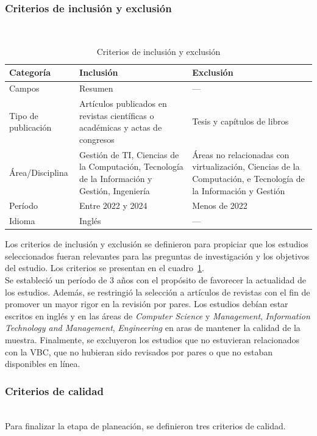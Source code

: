 \subsubsection{Criterios de inclusión y exclusión}
\mbox{}\\
\begin{table}[!t]
\centering
\renewcommand{\arraystretch}{1.4}
\begin{tabularx}{\textwidth}{>{\centering\arraybackslash}m{} >{\RaggedRight\arraybackslash}X >{\RaggedRight\arraybackslash}X}
\toprule
\textbf{Categoría} & \textbf{Inclusión} & \textbf{Exclusión} \\
\midrule
Campos & Resumen & --- \\
\midrule
Tipo de publicación & Artículos publicados en revistas científicas o académicas y actas de congresos & Tesis y capítulos de libros \\
\midrule
Área/Disciplina & Gestión de TI, Ciencias de la Computación, Tecnología de la Información y Gestión, Ingeniería & Áreas no relacionadas con virtualización, Ciencias de la Computación, e Tecnología de la Información y Gestión \\
\midrule
Período & Entre 2022 y 2024 & Menos de 2022 \\
\midrule
Idioma & Inglés & --- \\
\bottomrule
\end{tabularx}
\caption{Criterios de inclusión y exclusión}\label{tab:criterios}
\end{table}
Los criterios de inclusión y exclusión se definieron para propiciar que los estudios seleccionados fueran relevantes para las preguntas de investigación y los objetivos del estudio. Los criterios se presentan en el cuadro~\ref{tab:criterios}.\\
Se estableció un período de 3 años con el propósito de favorecer la actualidad de los estudios. Además, se restringió la selección a artículos de revistas con el fin de promover un mayor rigor en la revisión por pares. Los estudios debían estar escritos en inglés y en las áreas de \textit{Computer Science} y \textit{Management}, \textit{Information Technology and Management}, \textit{Engineering} en aras de mantener la calidad de la muestra. Finalmente, se excluyeron los estudios que no estuvieran relacionados con la VBC, que no hubieran sido revisados por pares o que no estaban disponibles en línea.\\

\subsubsection{Criterios de calidad}
\mbox{}\\
Para finalizar la etapa de planeación, se definieron tres criterios de calidad. \\

